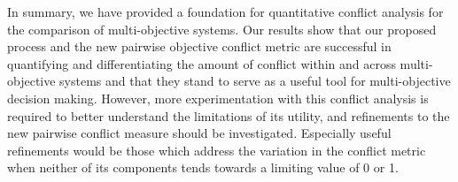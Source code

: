 In summary, we have provided a foundation for quantitative conflict analysis for the comparison of multi-objective systems. Our results show that our proposed process and the new pairwise objective conflict metric are successful in quantifying and differentiating the amount of conflict within and across multi-objective systems and that they stand to serve as a useful tool for multi-objective decision making. However, more experimentation with this conflict analysis is required to better understand the limitations of its utility, and refinements to the new pairwise conflict measure should be investigated. Especially useful refinements would be those which address the variation in the conflict metric when neither of its components tends towards a limiting value of 0 or 1.